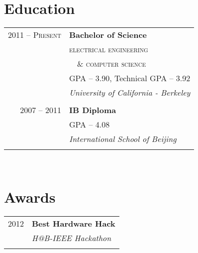 \documentclass[10pt]{article} %
\begin{document}
{\begin{minipage}[t]{0.44\textwidth}

\section{Education} 

\begin{tabular}{rl} %


2011 -- \textsc{Present} & \textbf{Bachelor of Science} \\ 
& \textsc{electrical engineering} \\
& \,\,\,\, \textsc{\& computer science} \\ 
& \small GPA -- 3.90, Technical GPA -- 3.92 \\
& \textit{University of California - Berkeley}\\
&\\
	 

2007 -- 2011 & \textbf{IB Diploma} \\ 
& \small GPA -- 4.08 \\
& \textit{International School of Beijing}\\
&\\
	 

\end{tabular}\\


\section{Awards} 

\begin{tabular}{rl}
2012	 & \textbf{Best Hardware Hack}\\
& \textit{H@B-IEEE Hackathon}\\ \\


\end{tabular}
\end{minipage}}
\end{document}
